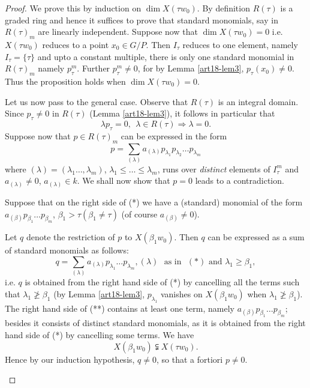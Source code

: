 \begin{proof}
We prove this by induction on $\dim X(\tau w_0)$. By definition $R(\tau)$ is a graded ring and hence it suffices to prove that standard monomials, say in $R(\tau)_m$ are linearly independent. Suppose now that $\dim X(\tau w_0)=0$ i.e. $X(\tau w_0)$ reduces to a point $x_0 \in G/P$. Then $I_\tau$ reduces to one element, namely $I_\tau = \{\tau\}$ and upto a constant multiple, there is only one standard monomial in $R(\tau)_m$ namely $p^m_\tau$. Further $p^m_\tau \neq 0$, for by Lemma \ref{art18-lem3}, $p_\tau (x_0) \neq 0$. Thus the proposition holds when $\dim X (\tau w_0) =0$.

Let us now pass to the general case. Observe that $R(\tau)$ is an integral domain. Since $p_\tau\neq 0$ in $R(\tau)$ (Lemma \ref{art18-lem3}), it follows in particular that 
$$
\lambda p_\tau = 0, ~~ \lambda \in R (\tau ) \Rightarrow \lambda = 0.
$$
Suppose now that $p\in R(\tau)_m$ can be expressed in the form 
\begin{equation*}
p = \sum\limits_{(\lambda)} a_{(\lambda)} p_{\lambda_1} p_{\lambda_{2}} \ldots p_{\lambda_m} \tag{*}
\end{equation*}
where $(\lambda) = (\lambda_1 \ldots, \lambda_m)$, $\lambda_1 \leqslant \ldots \leqslant \lambda_m$, runs over {\em distinct} elements of $I^m_\tau$ and $a_{(\lambda)} \neq 0$, $a_{(\lambda)} \in k$. We shall now show that $p=0$ leads to a contradiction.

\begin{romancase}\label{art18-romancasei}
Suppose that on the right side of (*) we have a (standard) monomial of the form $a_{(\beta)} p_{\beta_1} \ldots p_{\beta_m}$, $\beta_1 > \tau (\beta_1 \neq \tau)$ (of course $a_{(\beta)} \neq 0$).

Let $q$ denote the restriction of $p$ to $X (\beta_1 w_0)$. Then $q$ can be expressed as a sum of standard monomials as follows:
\begin{equation*}
q = \sum\limits_{(\lambda)} a_{(\lambda)} p_{\lambda_1} \ldots p_{\lambda_m}, (\lambda) \text{~ as in ~} (*) \text{ and } \lambda_1 \geqslant \beta_1, \tag{**}
\end{equation*}
i.e. $q$ is obtained from the right hand side of (*) by cancelling all the terms such that $\lambda_1 \not\geqslant \beta_1$ (by Lemma \ref{art18-lem3}, $p_{\lambda_1}$ vanishes on $X(\beta_1 w_0)$ when $\lambda_1 \not\geqslant \beta_1$). The right hand side of (**) contains at least one term, namely $a_{(\beta)} p_{\beta_1} \ldots p_{\beta_m}$; besides it consists of distinct standard monomials, as it is obtained from the right hand side of (*) by cancelling some terms. We have
$$
X (\beta_1 w_0) \subsetneqq  X (\tau w_0).
$$\pageoriginale
Hence by our induction hypothesis, $q \neq 0$, so that a fortiori $p \neq 0$. 
\end{romancase}


\end{proof}
